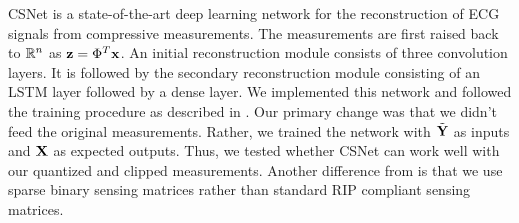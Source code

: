 CSNet \cite{zhang2021csnet} is a state-of-the-art deep learning network
for the reconstruction of ECG signals from compressive
measurements. The measurements are first raised back
to $\mathbb{R}^n$ as $\mathbf{z} = \Phi^T \mathbf{x}$. 
An initial reconstruction module consists of three convolution
layers. It is followed by the secondary reconstruction module
consisting of an LSTM layer followed by a dense layer.
We implemented this network and followed the training procedure
as described in \cite{zhang2021csnet}.
Our primary change was that we didn't feed the original
measurements.
Rather, we trained the network with $\tilde{\mathbf{Y}}$
as inputs and $\mathbf{X}$ as expected outputs.
Thus, we tested whether CSNet can work well with our
quantized and clipped measurements. 
Another difference from \cite{zhang2021csnet} is that
we use sparse binary sensing matrices rather than standard RIP compliant
sensing matrices.

